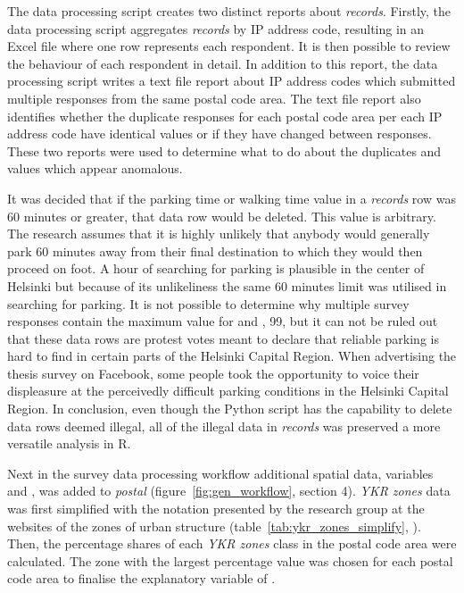 The data processing script creates two distinct reports about \textit{records}. Firstly, the data processing script aggregates \textit{records} by IP address code, resulting in an Excel file where one row represents each respondent. It is then possible to review the behaviour of each respondent in detail. In addition to this report, the data processing script writes a text file report about IP address codes which submitted multiple responses from the same postal code area. The text file report also identifies whether the duplicate responses for each postal code area per each IP address code have identical values or if they have changed between responses. These two reports were used to determine what to do about the duplicates and values which appear anomalous.

It was decided that if the parking time or walking time value in a \textit{records} row was 60 minutes or greater, that data row would be deleted. This value is arbitrary. The research assumes that it is highly unlikely that anybody would generally park 60 minutes away from their final destination to which they would then proceed on foot. A hour of searching for parking is plausible in the center of Helsinki but because of its unlikeliness the same 60 minutes limit was utilised in searching for parking. It is not possible to determine why multiple survey responses contain the maximum value for  and , 99, but it can not be ruled out that these data rows are protest votes meant to declare that reliable parking is hard to find in certain parts of the Helsinki Capital Region. When advertising the thesis survey on Facebook, some people took the opportunity to voice their displeasure at the perceivedly difficult parking conditions in the Helsinki Capital Region. In conclusion, even though the Python script has the capability to delete data rows deemed illegal, all of the illegal data in \textit{records} was preserved a more versatile analysis in R.

Next in the survey data processing workflow additional spatial data, variables  and , was added to \textit{postal} (figure~\ref{fig:gen_workflow}, section 4). \textit{YKR zones} data was first simplified with the notation presented by the research group at the websites of the zones of urban structure (table~\ref{tab:ykr_zones_simplify}, \cite{FinnishEnvironmentInstitute2013}). Then, the percentage shares of each \textit{YKR zones} class in the postal code area were calculated. The zone with the largest percentage value was chosen for each postal code area to finalise the explanatory variable of .

